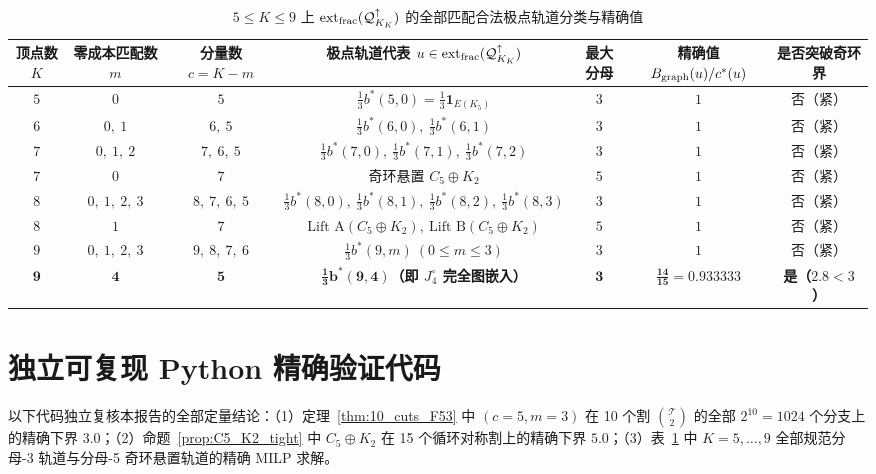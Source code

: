\documentclass[11pt,a4paper]{ctexart}
\theoremstyle{definition}
\newcommand{\1}{\boldsymbol 1}
\newcommand{\0}{\boldsymbol 0}
\newcommand{\bgraph}{B_{\rm graph}}
\newcommand{\ct}{c^*}
\begin{document}
\begin{table}[htbp]
\centering
\small
\caption{$5\le K\le 9$ 上 $\operatorname{ext}_{\rm frac}(\mathcal Q_{K_K}^{\uparrow})$ 的全部匹配合法极点轨道分类与精确值}\label{tab:orbits_summary}
\vspace{1mm}
\begin{tabular}{@{}ccccccc@{}}
\toprule
顶点数 $K$ & 零成本匹配数 $m$ & 分量数 $c=K-m$ & 极点轨道代表 $u\in\operatorname{ext}_{\rm frac}(\mathcal Q_{K_K}^{\uparrow})$ & 最大分母 & 精确值 $\bgraph(u)/\ct(u)$ & 是否突破奇环界 \\
\midrule
$5$ & $0$ & $5$ & $\frac{1}{3}b^*(5,0)=\frac{1}{3}\1_{E(K_5)}$ & $3$ & $1$ & 否（紧） \\
$6$ & $0,\ 1$ & $6,\ 5$ & $\frac{1}{3}b^*(6,0),\ \frac{1}{3}b^*(6,1)$ & $3$ & $1$ & 否（紧） \\
$7$ & $0,\ 1,\ 2$ & $7,\ 6,\ 5$ & $\frac{1}{3}b^*(7,0),\ \frac{1}{3}b^*(7,1),\ \frac{1}{3}b^*(7,2)$ & $3$ & $1$ & 否（紧） \\
$7$ & $0$ & $7$ & 奇环悬置 $C_5\oplus K_2$ & $5$ & $1$ & 否（紧） \\
$8$ & $0,\ 1,\ 2,\ 3$ & $8,\ 7,\ 6,\ 5$ & $\frac{1}{3}b^*(8,0),\ \frac{1}{3}b^*(8,1),\ \frac{1}{3}b^*(8,2),\ \frac{1}{3}b^*(8,3)$ & $3$ & $1$ & 否（紧） \\
$8$ & $1$ & $7$ & $\text{Lift A}(C_5\oplus K_2),\ \text{Lift B}(C_5\oplus K_2)$ & $5$ & $1$ & 否（紧） \\
\midrule
$9$ & $0,\ 1,\ 2,\ 3$ & $9,\ 8,\ 7,\ 6$ & $\frac{1}{3}b^*(9,m)\ (0\le m\le 3)$ & $3$ & $1$ & 否（紧） \\
$\bm{9}$ & $\bm{4}$ & $\bm{5}$ & $\bm{\frac{1}{3}b^*(9,4)}$\textbf{（即 $J_4^\circ$ 完全图嵌入）} & $\bm{3}$ & $\bm{\frac{14}{15}=0.933333}$ & \textbf{是（$2.8<3$）} \\
\bottomrule
\end{tabular}
\end{table}

\newpage
\appendix
\section{独立可复现 Python 精确验证代码}

以下代码独立复核本报告的全部定量结论：（1）定理~\ref{thm:10_cuts_F53} 中 $(c=5,m=3)$ 在 10 个割 $\binom{\mathcal T}{2}$ 的全部 $2^{10}=1024$ 个分支上的精确下界 $3.0$；（2）命题~\ref{prop:C5_K2_tight} 中 $C_5\oplus K_2$ 在 15 个循环对称割上的精确下界 $5.0$；（3）表~\ref{tab:orbits_summary} 中 $K=5,\dots,9$ 全部规范分母-3 轨道与分母-5 奇环悬置轨道的精确 MILP 求解。
\end{document}
